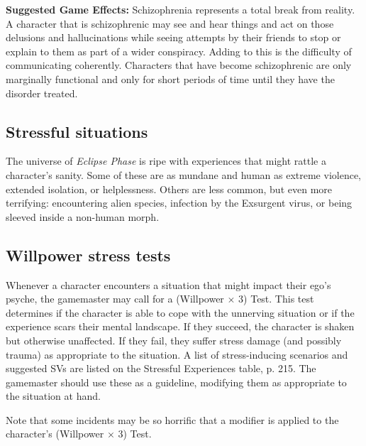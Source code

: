 \textbf{Suggested Game Effects:} Schizophrenia represents a total break from reality. A character that is schizophrenic may see and hear things and act on those delusions and hallucinations while seeing attempts by their friends to stop or explain to them as part of a wider conspiracy. Adding to this is the difficulty of communicating coherently. Characters that have become schizophrenic are only marginally functional and only for short periods of time until they have the disorder treated.


\subsection{Stressful situations}
\label{sec:stressful-situations}

The universe of \emph{Eclipse Phase} is ripe with experiences that might rattle a character’s sanity. Some of these are as mundane and human as extreme violence, extended isolation, or helplessness. Others are less common, but even more terrifying: encountering alien species, infection by the Exsurgent virus, or being sleeved inside a non-human morph.


\subsection{Willpower stress tests}
\label{sec:willpower-stress-tests}

Whenever a character encounters a situation that might impact their ego’s psyche, the gamemaster may call for a (Willpower $\times$ 3) Test. This test determines if the character is able to cope with the unnerving situation or if the experience scars their mental landscape. If they succeed, the character is shaken but otherwise unaffected. If they fail, they suffer stress damage (and possibly trauma) as appropriate to the situation. A list of stress-inducing scenarios and suggested SVs are listed on the Stressful Experiences table, p. 215. The gamemaster should use these as a guideline, modifying them as appropriate to the situation at hand.

Note that some incidents may be so horrific that a modifier is applied to the character’s (Willpower $\times$ 3) Test.

